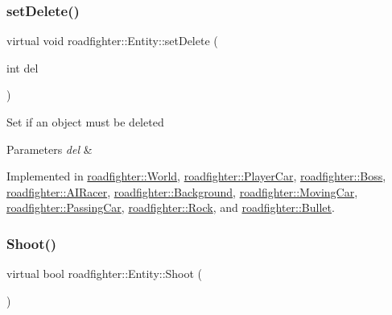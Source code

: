 \mbox{\label{classroadfighter_1_1Entity_a07e973f0fa941a69e749629716877692}} 
\subsubsection{\texorpdfstring{set\+Delete()}{setDelete()}}
{\footnotesize\ttfamily virtual void roadfighter\+::\+Entity\+::set\+Delete (\begin{DoxyParamCaption}\item[{int}]{del }\end{DoxyParamCaption})\hspace{0.3cm}{\ttfamily [pure virtual]}}

Set if an object must be deleted 
\begin{DoxyParams}{Parameters}
{\em del} & \\
\hline
\end{DoxyParams}


Implemented in \hyperlink{classroadfighter_1_1World_a78c860f6700cd7f8e47994c02e7fd181}{roadfighter\+::\+World}, \hyperlink{classroadfighter_1_1PlayerCar_a24401332a8585b0fcfbfd33df93021e0}{roadfighter\+::\+Player\+Car}, \hyperlink{classroadfighter_1_1Boss_a8e2d5737afc0df4bc8b8ad0ddc03f5b8}{roadfighter\+::\+Boss}, \hyperlink{classroadfighter_1_1AIRacer_a10823d4a02dbdad6d760020f8cee7afe}{roadfighter\+::\+A\+I\+Racer}, \hyperlink{classroadfighter_1_1Background_acb4cdc56872d164b297b5655124df54d}{roadfighter\+::\+Background}, \hyperlink{classroadfighter_1_1MovingCar_a2fd9123a7ee59d4796672ad79656e1b5}{roadfighter\+::\+Moving\+Car}, \hyperlink{classroadfighter_1_1PassingCar_aad1905fcb427945c3300840deedffb1d}{roadfighter\+::\+Passing\+Car}, \hyperlink{classroadfighter_1_1Rock_ae2cef1d49610edd8b0438b6c84fdabfd}{roadfighter\+::\+Rock}, and \hyperlink{classroadfighter_1_1Bullet_ac3be16d9ff7da992fc6c5bd641f6d8dc}{roadfighter\+::\+Bullet}.

\mbox{\label{classroadfighter_1_1Entity_ad0ecaa0539db252e591da83814251509}} 
\subsubsection{\texorpdfstring{Shoot()}{Shoot()}}
{\footnotesize\ttfamily virtual bool roadfighter\+::\+Entity\+::\+Shoot (\begin{DoxyParamCaption}{ }\end{DoxyParamCaption})\hspace{0.3cm}{\ttfamily [pure virtual]}}

